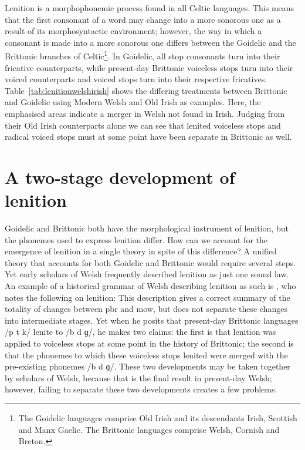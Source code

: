 Lenition is a morphophonemic process found in all Celtic languages. This means that the first consonant of a word may change into a more sonorous one as a result of its morphosyntactic environment; however, the way in which a consonant is made into a more sonorous one differs between the Goidelic and the Brittonic branches of Celtic\footnote{The Goidelic languages comprise Old Irish and its descendants Irish, Scottish and Manx Gaelic. The Brittonic languages comprise Welsh, Cornish and Breton.}. In Goidelic, all stop consonants turn into their fricative counterparts, while present-day Brittonic voiceless stops turn into their voiced counterparts and voiced stops turn into their respective fricatives. Table~\ref{tab:lenitionwelshirish} shows the differing treatments between Brittonic and Goidelic using Modern Welsh and Old Irish as examples. Here, the emphasised areas indicate a merger in Welsh not found in Irish. Judging from their Old Irish counterparts alone we can see that lenited voiceless stops  and radical voiced stops  must at some point have been separate in Brittonic as well.

\section{A two-stage development of lenition}
\label{sec:two-stage-devel}
Goidelic and Brittonic both have the morphological instrument of lenition, but the \gls{phoneme}s used to express lenition differ. How can we account for the emergence of lenition in a single theory in spite of this difference? A unified theory that accounts for both Goidelic and Brittonic would require several steps. Yet early scholars of Welsh  frequently described lenition as just one sound law. An example of a historical grammar of Welsh describing lenition as such is \textcite{Mor_Welsh13}, who notes the following on lenition:
This description gives a correct summary of the totality of changes between \gls{pbr} and \gls{mow}, but does not separate these changes  into intermediate stages. 
Yet when he posits that present-day Brittonic languages /p t k/ lenite to /b d ɡ/, he makes two claims: the first is that lenition was applied to voiceless stops at some point in the history of Brittonic; the second is that the \gls{phoneme}s to which these voiceless stops lenited were merged with the pre-existing \gls{phoneme}s /b d ɡ/. These two developments may be taken together by scholars of \eg Welsh, because that is the final result in present-day Welsh; however, failing to separate these two developments  creates a few problems.


